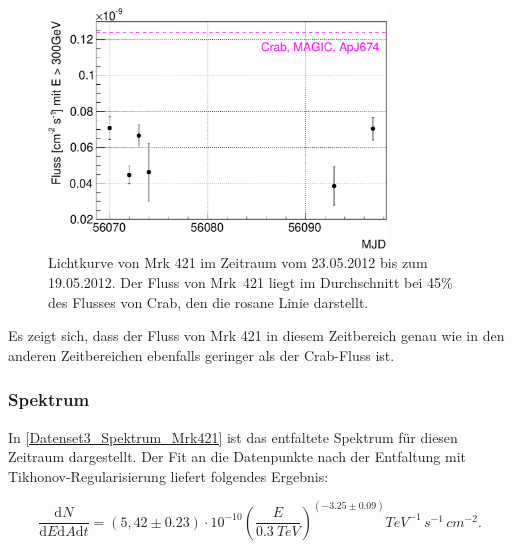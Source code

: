 \begin{figure}
    \centering
    \includegraphics[width=0.8\textwidth]{./Plots/04_MrkAnalyse/Datenset3/Datenset3_Mrk421_LC.pdf}
    \caption{Lichtkurve von Mrk 421 im Zeitraum vom 23.05.2012 bis zum 19.05.2012.
    Der Fluss von Mrk~421 liegt im Durchschnitt bei 45\% des Flusses von Crab, den die rosane Linie darstellt.}
    \label{Datenset3_LC_Mrk421}
\end{figure}

Es zeigt sich, dass der Fluss von Mrk 421 in diesem Zeitbereich genau wie in den anderen Zeitbereichen ebenfalls geringer als der Crab-Fluss ist.


\subsubsection{Spektrum}

In \autoref{Datenset3_Spektrum_Mrk421} ist das entfaltete Spektrum für diesen Zeitraum dargestellt.
Der Fit an die Datenpunkte nach der Entfaltung mit Tikhonov-Regularisierung liefert folgendes Ergebnis:

\begin{equation}
 \frac{\mathrm{d}N}{\mathrm{d}E\mathrm{d}A\mathrm{d}t}=(5,42 \pm 0.23) \cdot 10^{-10}\left( \frac{E}{\SI{0,3}{TeV}} \right)^{(-3.25 \pm 0.09)} \si{TeV^{-1}\,s^{-1}\,cm^{-2}}.
\end{equation}

